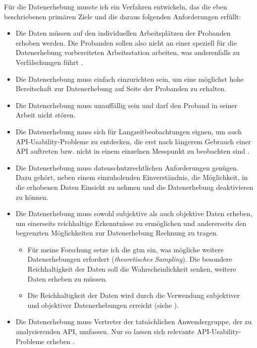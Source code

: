 Für die Datenerhebung musste ich ein Verfahren entwickeln, das die eben beschriebenen primären Ziele und die daraus folgenden Anforderungen erfüllt:
\begin{itemize}
  \item Die Daten müssen auf den individuellen Arbeitsplätzen der Probanden erhoben werden. Die Probanden sollen also nicht an einer speziell für die Datenerhebung vorbereiteten Arbeitsstation arbeiten, was anderenfalls zu Verfälschungen führt \citep{McKeogh:2004gj}.
  \item Die Datenerhebung muss einfach einzurichten sein, um eine möglichst hohe Bereitschaft zur Datenerhebung auf Seite der Probanden zu erhalten.
  \item Die Datenerhebung muss unauffällig sein und darf den Proband in seiner Arbeit nicht stören.
  \item Die Datenerhebung muss sich für Langzeitbeobachtungen eignen, um auch API-Usability-Probleme zu entdecken, die erst nach längerem Gebrauch einer API auftreten \citep{Stylos:2007jb,Ellis:2007kv} bzw. nicht in einem einzelnen Messpunkt zu beobachten sind \citep{Grill:2012jm,Tenny:2011jp}.
  \item Die Datenerhebung muss datenschutzrechtlichen Anforderungen genügen. Dazu gehört, neben einem einzuholenden Einverständnis, die Möglichkeit, in die erhobenen Daten Einsicht zu nehmen und die Datenerhebung deaktivieren zu können.
  \item Die Datenerhebung muss sowohl subjektive als auch objektive Daten erheben, um einerseits reichhaltige Erkenntnisse zu ermöglichen und andererseits den begrenzten Möglichkeiten zur Datenerhebung Rechnung zu tragen.
  \begin{itemize}
    \item Für meine Forschung setze ich die \gls{gtm} ein, was mögliche weitere Datenerhebungen erfordert (\textit{theoretisches Sampling}). Die besondere Reichhaltigkeit der Daten soll die Wahrscheinlichkeit senken, weitere Daten erheben zu müssen.
    \item Die Reichhaltigkeit der Daten wird durch die Verwendung subjektiver und objektiver Datenerhebungen erreicht (siehe ).
  \end{itemize}
  \item Die Datenerhebung muss Vertreter der tatsächlichen Anwendergruppe, der zu analysierenden API, umfassen. Nur so lassen sich relevante API-Usability-Probleme erheben \citep{Clarke:2004te,Henning:2007kg}.
\end{itemize}


